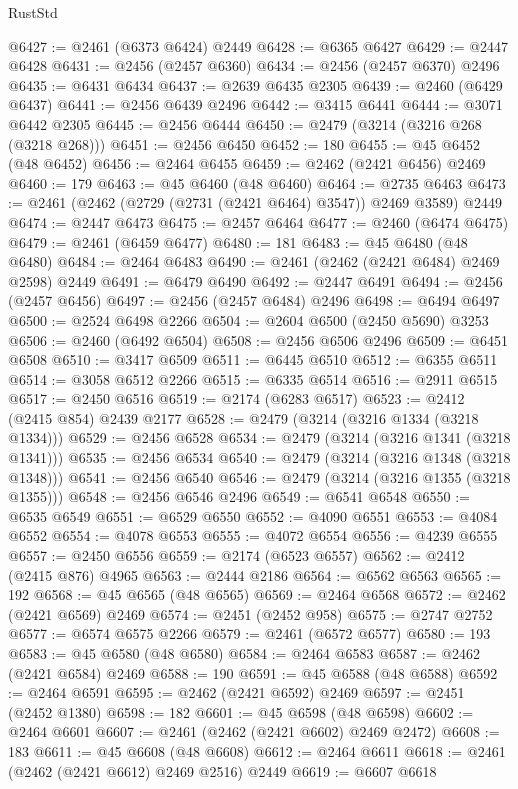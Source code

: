 \begin{lexlean}{RustStd}
\begin{coremodule}
@6427 := @2461 (@6373 @6424) @2449
@6428 := @6365 @6427
@6429 := @2447 @6428
@6431 := @2456 (@2457 @6360)
@6434 := @2456 (@2457 @6370) @2496
@6435 := @6431 @6434
@6437 := @2639 @6435 @2305
@6439 := @2460 (@6429 @6437)
@6441 := @2456 @6439 @2496
@6442 := @3415 @6441
@6444 := @3071 @6442 @2305
@6445 := @2456 @6444
@6450 := @2479 (@3214 (@3216 @268 (@3218 @268)))
@6451 := @2456 @6450
@6452 := 180
@6455 := @45 @6452 (@48 @6452)
@6456 := @2464 @6455
@6459 := @2462 (@2421 @6456) @2469
@6460 := 179
@6463 := @45 @6460 (@48 @6460)
@6464 := @2735 @6463
@6473 := @2461 (@2462 (@2729 (@2731 (@2421 @6464) @3547)) @2469 @3589) @2449
@6474 := @2447 @6473
@6475 := @2457 @6464
@6477 := @2460 (@6474 @6475)
@6479 := @2461 (@6459 @6477)
@6480 := 181
@6483 := @45 @6480 (@48 @6480)
@6484 := @2464 @6483
@6490 := @2461 (@2462 (@2421 @6484) @2469 @2598) @2449
@6491 := @6479 @6490
@6492 := @2447 @6491
@6494 := @2456 (@2457 @6456)
@6497 := @2456 (@2457 @6484) @2496
@6498 := @6494 @6497
@6500 := @2524 @6498 @2266
@6504 := @2604 @6500 (@2450 @5690) @3253
@6506 := @2460 (@6492 @6504)
@6508 := @2456 @6506 @2496
@6509 := @6451 @6508
@6510 := @3417 @6509
@6511 := @6445 @6510
@6512 := @6355 @6511
@6514 := @3058 @6512 @2266
@6515 := @6335 @6514
@6516 := @2911 @6515
@6517 := @2450 @6516
@6519 := @2174 (@6283 @6517)
@6523 := @2412 (@2415 @854) @2439 @2177
@6528 := @2479 (@3214 (@3216 @1334 (@3218 @1334)))
@6529 := @2456 @6528
@6534 := @2479 (@3214 (@3216 @1341 (@3218 @1341)))
@6535 := @2456 @6534
@6540 := @2479 (@3214 (@3216 @1348 (@3218 @1348)))
@6541 := @2456 @6540
@6546 := @2479 (@3214 (@3216 @1355 (@3218 @1355)))
@6548 := @2456 @6546 @2496
@6549 := @6541 @6548
@6550 := @6535 @6549
@6551 := @6529 @6550
@6552 := @4090 @6551
@6553 := @4084 @6552
@6554 := @4078 @6553
@6555 := @4072 @6554
@6556 := @4239 @6555
@6557 := @2450 @6556
@6559 := @2174 (@6523 @6557)
@6562 := @2412 (@2415 @876) @4965
@6563 := @2444 @2186
@6564 := @6562 @6563
@6565 := 192
@6568 := @45 @6565 (@48 @6565)
@6569 := @2464 @6568
@6572 := @2462 (@2421 @6569) @2469
@6574 := @2451 (@2452 @958)
@6575 := @2747 @2752
@6577 := @6574 @6575 @2266
@6579 := @2461 (@6572 @6577)
@6580 := 193
@6583 := @45 @6580 (@48 @6580)
@6584 := @2464 @6583
@6587 := @2462 (@2421 @6584) @2469
@6588 := 190
@6591 := @45 @6588 (@48 @6588)
@6592 := @2464 @6591
@6595 := @2462 (@2421 @6592) @2469
@6597 := @2451 (@2452 @1380)
@6598 := 182
@6601 := @45 @6598 (@48 @6598)
@6602 := @2464 @6601
@6607 := @2461 (@2462 (@2421 @6602) @2469 @2472)
@6608 := 183
@6611 := @45 @6608 (@48 @6608)
@6612 := @2464 @6611
@6618 := @2461 (@2462 (@2421 @6612) @2469 @2516) @2449
@6619 := @6607 @6618

\end{coremodule}
\end{lexlean}
